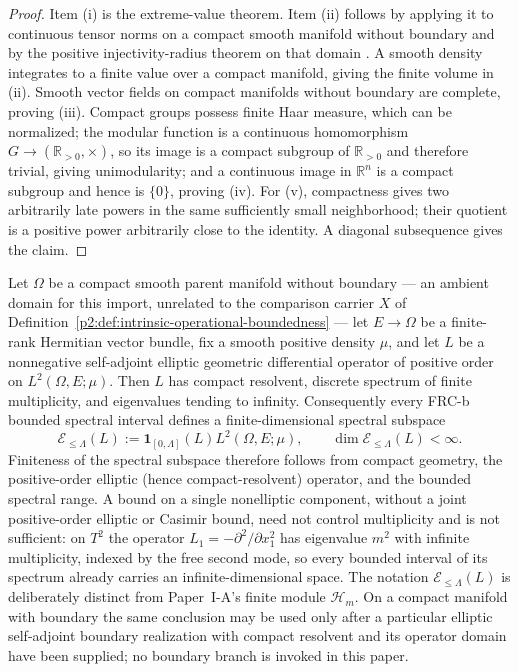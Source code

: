 \documentclass[11pt,a4paper]{article}
\begin{document}
\begin{proof}
Item (i) is the extreme-value theorem.  Item (ii) follows by applying it to
continuous tensor norms on a compact smooth manifold without boundary and by
the positive injectivity-radius theorem on that domain
\cite{do1992riemannian}.  A smooth density integrates to a finite
value over a compact manifold, giving the finite volume in (ii).  Smooth vector
fields on compact manifolds without boundary are complete, proving (iii).
Compact groups possess finite Haar measure, which can be normalized; the
modular function is a continuous homomorphism \(G\to(\mathbb R_{>0},\times)\),
so its image is a compact subgroup of \(\mathbb R_{>0}\) and therefore
trivial, giving unimodularity; and a continuous image in \(\mathbb R^n\) is a
compact subgroup and hence is \(\{0\}\), proving (iv).  For (v), compactness
gives two arbitrarily late powers in the same sufficiently small neighborhood;
their quotient is a positive power arbitrarily close to the identity.  A
diagonal subsequence gives the claim.
\end{proof}

\begin{theorem}
\label{p2:thm:gp1-bounded-spectrum-finite-carrier}
Let \(\Omega\) be a compact smooth parent manifold without boundary --- an ambient domain for
this import, unrelated to the comparison carrier \(X\) of
Definition~\ref{p2:def:intrinsic-operational-boundedness} --- let
\(E\to\Omega\) be a finite-rank
Hermitian vector bundle, fix a smooth positive density \(\mu\), and let \(L\)
be a nonnegative self-adjoint elliptic geometric differential operator of
positive order on
\(L^2(\Omega,E;\mu)\).  Then \(L\) has compact resolvent, discrete spectrum of
finite multiplicity, and eigenvalues tending to infinity.  Consequently
every FRC-b bounded spectral interval defines a finite-dimensional spectral
subspace
\[
 \mathcal E_{\leq\Lambda}(L)
 :=\mathbf1_{[0,\Lambda]}(L)L^2(\Omega,E;\mu),
 \qquad \dim\mathcal E_{\leq\Lambda}(L)<\infty.
\]
Finiteness of the spectral subspace therefore follows from compact geometry,
the positive-order elliptic (hence compact-resolvent) operator, and the bounded
spectral range.  A bound on a single nonelliptic component, without a joint
positive-order elliptic or Casimir bound, need not control multiplicity and is
not sufficient: on \(T^2\) the operator \(L_1=-\partial^2/\partial x_1^2\) has
eigenvalue \(m^2\) with infinite multiplicity, indexed by the free second
mode, so every bounded interval of its spectrum already carries an
infinite-dimensional space.  The notation
\(\mathcal E_{\leq\Lambda}(L)\) is deliberately distinct from Paper~I-A's
finite module \(\mathcal H_m\).  On a compact manifold with boundary the same
conclusion may be used only after a particular elliptic self-adjoint boundary
realization with compact resolvent and its operator domain have been supplied;
no boundary branch is invoked in this paper.
\end{theorem}
\end{document}
